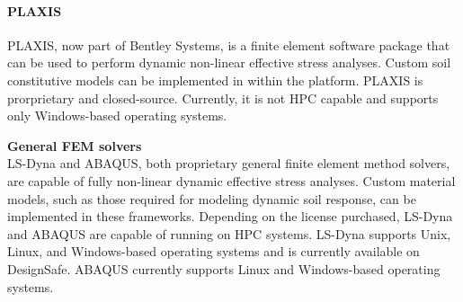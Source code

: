\paragraph{PLAXIS}
PLAXIS, now part of Bentley Systems, is a finite element software package that can be used to perform dynamic non-linear effective stress analyses. Custom soil constitutive models can be implemented in within the platform. PLAXIS is prorprietary and closed-source. Currently, it is not HPC capable and supports only Windows-based operating systems.

\noindent\textbf{General FEM solvers}\\
LS-Dyna and ABAQUS, both proprietary general finite element method solvers, are capable of fully non-linear dynamic effective stress analyses. Custom material models, such as those required for modeling dynamic soil response, can be implemented in these frameworks. Depending on the license purchased, LS-Dyna and ABAQUS are capable of running on HPC systems. LS-Dyna supports Unix, Linux, and Windows-based operating systems and is currently available on DesignSafe. ABAQUS currently supports Linux and Windows-based operating systems.\\




